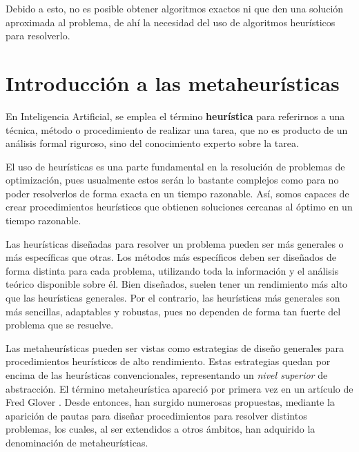 Debido a esto, no es posible obtener algoritmos exactos ni que den una solución
aproximada al problema, de ahí la necesidad del uso de algoritmos heurísticos para
resolverlo.

\section{Introducción a las metaheurísticas}\citep{melian:2003}\citep{herrera:2014}

En Inteligencia Artificial, se emplea el término \textbf{heurística} para referirnos
a una técnica, método o procedimiento de realizar una tarea, que no es producto de
un análisis formal riguroso, sino del conocimiento experto sobre la tarea.

El uso de heurísticas es una parte fundamental en la resolución de problemas de
optimización, pues usualmente estos serán lo bastante complejos como para no poder
resolverlos de forma exacta en un tiempo razonable. Así, somos capaces de crear
procedimientos heurísticos que obtienen soluciones cercanas al óptimo en un tiempo
razonable.

Las heurísticas diseñadas para resolver un problema pueden ser más generales o más
específicas que otras. Los métodos más específicos deben ser diseñados de forma
distinta para cada problema, utilizando toda la información y el análisis teórico
disponible sobre él. Bien diseñados, suelen tener un rendimiento más alto que las
heurísticas generales. Por el contrario, las heurísticas más generales son más sencillas,
adaptables y robustas, pues no dependen de forma tan fuerte del problema que se resuelve.

Las metaheurísticas pueden ser vistas como estrategias de diseño generales para
procedimientos heurísticos de alto rendimiento. Estas estrategias quedan por encima
de las heurísticas convencionales, representando un \textit{nivel superior} de abstracción.
El término metaheurística apareció por primera vez en un artículo de Fred Glover
\citep{glover:1986}. Desde entonces, han surgido numerosas propuestas, mediante la
aparición de pautas para diseñar procedimientos para resolver distintos problemas,
los cuales, al ser extendidos a otros ámbitos, han adquirido la denominación de metaheurísticas.

